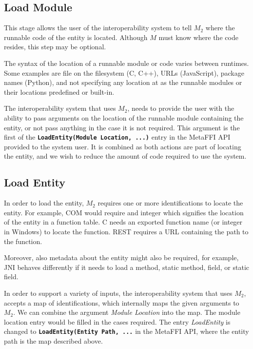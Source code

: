 \documentclass[sigplan,10pt,manuscript,nonacm]{acmart}
\begin{document}
\subsection{Load Module}

This stage allows the user of the interoperability system to tell $M_2$ where the runnable code of the entity is located. Although $M$ must know where the code resides, this step may be optional.

The syntax of the location of a runnable module or code varies between runtimes. Some examples are file on the filesystem (C, C++), URLs (JavaScript), package names (Python), and not specifying any location at as the runnable modules or their locations predefined or built-in.

The interoperability system that uses $M_2$, needs to provide the user with the ability to pass arguments on the location of the runnable module containing the entity, or not pass anything in the case it is not required. This argument is the first of the \texttt{\textbf{LoadEntity(Module Location, ...)}} entry in the MetaFFI API provided to the system user. It is combined as both actions are part of locating the entity, and we wish to reduce the amount of code required to use the system.

\subsection{Load Entity}

In order to load the entity, $M_2$ requires one or more identifications to locate the entity. For example, COM would require and integer which signifies the location of the entity in a function table. C needs an exported function name (or integer in Windows) to locate the function. REST requires a URL containing the path to the function.

Moreover, also metadata about the entity might also be required, for example, JNI behaves differently if it needs to load a method, static method, field, or static field.

In order to support a variety of inputs, the interoperability system that uses $M_2$, accepts a map of identifications, which internally maps the given arguments to $M_2$. We can combine the argument \textit{Module Location} into the map. The module location entry would be filled in the cases required. The entry \textit{LoadEntity} is changed to \texttt{\textbf{LoadEntity(Entity Path, ...}} in the MetaFFI API, where the entity path is the map described above.
\end{document}
